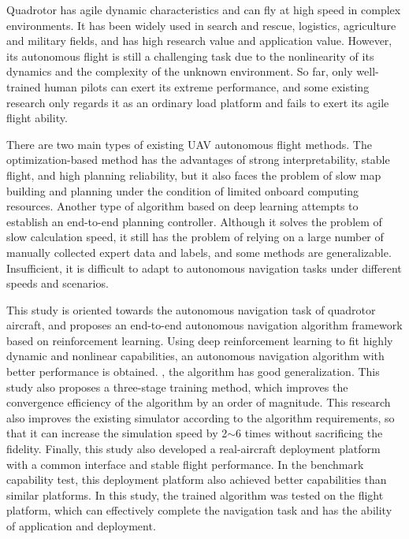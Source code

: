 \begin{abstract*}

  Quadrotor has agile dynamic characteristics and can fly at high speed in complex environments. It has been widely used in search and rescue, logistics, agriculture and military fields, and has high research value and application value. However, its autonomous flight is still a challenging task due to the nonlinearity of its dynamics and the complexity of the unknown environment. So far, only well-trained human pilots can exert its extreme performance, and some existing research only regards it as an ordinary load platform and fails to exert its agile flight ability.

  There are two main types of existing UAV autonomous flight methods. The optimization-based method has the advantages of strong interpretability, stable flight, and high planning reliability, but it also faces the problem of slow map building and planning under the condition of limited onboard computing resources. Another type of algorithm based on deep learning attempts to establish an end-to-end planning controller. Although it solves the problem of slow calculation speed, it still has the problem of relying on a large number of manually collected expert data and labels, and some methods are generalizable. Insufficient, it is difficult to adapt to autonomous navigation tasks under different speeds and scenarios.

  This study is oriented towards the autonomous navigation task of quadrotor aircraft, and proposes an end-to-end autonomous navigation algorithm framework based on reinforcement learning. Using deep reinforcement learning to fit highly dynamic and nonlinear capabilities, an autonomous navigation algorithm with better performance is obtained. , the algorithm has good generalization. This study also proposes a three-stage training method, which improves the convergence efficiency of the algorithm by an order of magnitude. This research also improves the existing simulator according to the algorithm requirements, so that it can increase the simulation speed by 2$\sim$6 times without sacrificing the fidelity. Finally, this study also developed a real-aircraft deployment platform with a common interface and stable flight performance. In the benchmark capability test, this deployment platform also achieved better capabilities than similar platforms. In this study, the trained algorithm was tested on the flight platform, which can effectively complete the navigation task and has the ability of application and deployment.

\end{abstract*}
